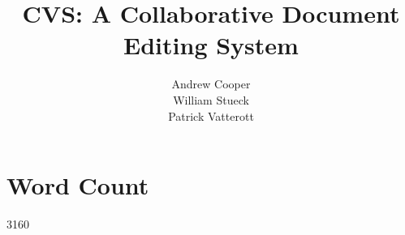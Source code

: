 \documentclass{6033dp1/6033dp1}
\title{CVS: A Collaborative Document Editing System}
\author{Andrew Cooper\\ William Stueck\\ Patrick Vatterott}
\begin{document}
\maketitle















\section{Word Count}
3160
\end{document}
